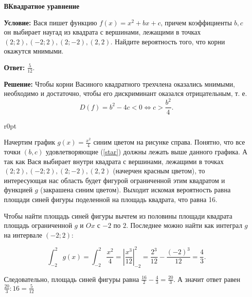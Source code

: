 \documentclass{exam}
\begin{document}
    
\textbf{ВКвадратное уравнение}

\textbf{Условие:} Вася пишет функцию $f(x) = x^2 + bx + c$, причем коэффициенты $b, c$ он выбирает наугад из квадрата с вершинами, лежащими в точках $(2; 2), (-2; 2), (2; -2), (2, 2)$. Найдите вероятность того, что корни окажутся мнимыми.

\textbf{Ответ:} $\frac{5}{12}$.

\textbf{Решение:} Чтобы корни Васиного квадратного трехчлена оказались мнимыми, необходимо и достаточно, чтобы его дискриминант оказался отрицательным, т. е.
\begin{equation}\label{star}
    D(f) = b^2 - 4c < 0 \iff c > \frac{b^2}{4}. \tag{$*$}
\end{equation}

\begin{wrapfigure}{r}{0pt}
    \hspace{10pt}
\end{wrapfigure}

Начертим график $g(x) = \frac{x^2}{4}$ синим цветом на рисунке справа. Понятно, что все точки $(b, c)$ удовлетворяющие (\ref{star}) должны лежать выше данного графика. А так как Вася выбирает внутри квадрата с вершинами, лежащими в точках $(2; 2), (-2; 2), (2; -2), (2, 2)$ (начерчен красным цветом), то интересующая нас область будет фигурой ограниченной этим квадратом и функцией $g$ (закрашена синим цветом). Выходит искомая вероятность равна площади синей фигуры поделенной на площадь квадрата, что равна 16.



Чтобы найти площадь синей фигуры вычтем из половины площади квадрата площадь ограниченной $g$ и $Ox$ с $-2$ по $2$. Последнее можно найти как интеграл $g$ на интервале $(-2;2)$:

$$\int_{-2}^{2}g(x) = \int_{-2}^{2} \frac{x^2}{4} = \left|\frac{x^3}{12}\right|_{-2}^{2} = \frac{2^3}{12} - \frac{(-2)^3}{12} = \frac{4}{3}.$$

Следовательно, площадь синей фигуры равна $\frac{16}{2} - \frac{4}{3} = \frac{20}{3}$. А значит ответ равен $\frac{20}{3} : 16 = \frac{5}{12}$
\end{document}
